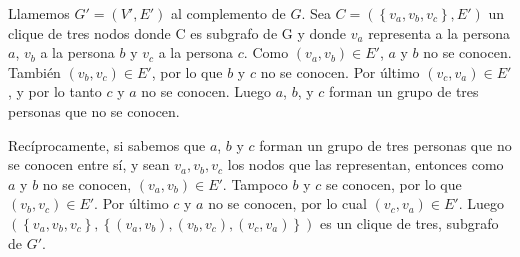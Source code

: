 \documentclass[a4paper, 12pt]{article}
\begin{document}
Llamemos $G' = \left( V', E' \right)$ al complemento de $G$.  Sea $ C = \left( \left\lbrace v_a, v_b,v_c \right\rbrace, E' \right) $ un clique de tres nodos donde C es subgrafo de G y donde $v_a$ representa a la persona $a$, $v_b$ a la persona $b$ y $v_c$ a la persona $c$. Como $\left( v_a,v_b\right) \in E'$, $a$ y $b$ no se conocen. Tambi\'en $\left( v_b,v_c\right) \in E'$, por lo que $b$ y $c$ no se conocen. Por \'ultimo $\left( v_c,v_a\right) \in E'$, y por lo tanto $c$ y $a$ no se conocen. Luego $a$, $b$, y $c$ forman un grupo de tres personas que no se conocen.



Rec\'iprocamente, si sabemos que $a$, $b$ y $c$ forman un grupo de tres personas que no se conocen entre s\'i, y sean $v_a, v_b, v_c$ los nodos que las representan, entonces como $a$ y $b$ no se conocen, $\left(v_a,v_b\right) \in E'$. Tampoco $b$ y $c$ se conocen, por lo que $\left(v_b,v_c\right) \in E'$. Por \'ultimo $c$ y $a$ no se conocen, por lo cual $\left(v_c,v_a\right) \in E'$. Luego $\left( \left\lbrace v_a, v_b, v_c \right\rbrace, \left\lbrace  \left(v_a,v_b\right) , \left( v_b,v_c\right), \left( v_c, v_a\right) \right\rbrace\right)$ es un clique de tres, subgrafo de $G'$.
\end{document}
